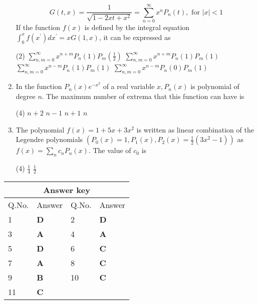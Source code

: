 \begin{enumerate}[label=\color{ocre}\textbf{\arabic*.}]
$$
G(t, x)=\frac{1}{\sqrt{1-2 x t+x^{2}}}=\sum_{n=0}^{\infty} x^{n} P_{n}(t), \text { for }|x|<1
$$
If the function $f(x)$ is defined by the integral equation $\int_{0}^{x} f\left(x^{\prime}\right) d x^{\prime}=x G(1, x)$, it can be expressed as
{}
\begin{tasks}(2)
	\task[\textbf{A.}] $\sum_{n, m=0}^{\infty} x^{n+m} P_{n}(1) P_{m}\left(\frac{1}{2}\right)$
	\task[\textbf{B.}] $\sum_{n, m=0}^{\infty} x^{n+m} P_{n}(1) P_{m}(1)$
	\task[\textbf{C.}] $\sum_{n, m=0}^{\infty} x^{n-m} P_{n}(1) P_{m}(1)$
	\task[\textbf{D.}] $\sum_{n, m=0}^{\infty} x^{n-m} P_{n}(0) P_{m}(1)$
\end{tasks}
	\item In the function $P_{n}(x) e^{-x^{2}}$ of a real variable $x, P_{n}(x)$ is polynomial of degree $n$. The maximum number of extrema that this function can have is
	{}
	\begin{tasks}(4)
		\task[\textbf{A.}] $n+2$
		\task[\textbf{B.}]  $n-1$
		\task[\textbf{C.}] $n+1$
		\task[\textbf{D.}] $n$
	\end{tasks}
	\item The polynomial $f(x)=1+5 x+3 x^{2}$ is written as linear combination of the Legendre polynomials
	$\left(P_{0}(x)=1, P_{1}(x), P_{2}(x)=\frac{1}{2}\left(3 x^{2}-1\right)\right)$ as $f(x)=\sum_{n} c_{n} P_{n}(x)$. The value of $c_{0}$ is
	{}
	\begin{tasks}(4)
		\task[\textbf{A.}] $\frac{1}{4}$
		\task[\textbf{B.}] $\frac{1}{2}$
	\end{tasks}
\end{enumerate}
\setlength\arrayrulewidth{1pt}
\begin{table}[H]
	\centering
	\begin{tabular}{|p{1.5cm}|p{1.5cm}||p{1.5cm}|p{1.5cm}|}
		\hline
		\multicolumn{4}{|c|}{\textbf{Answer key}}\\\hline\hline
		\rowcolor{ocrel}Q.No.&Answer&Q.No.&Answer\\\hline
	1&\textbf{D} &2&\textbf{D}\\\hline 
	3&\textbf{A} &4&\textbf{A} \\\hline
	5&\textbf{D} &6&\textbf{C} \\\hline
	7&\textbf{A}&8&\textbf{C}\\\hline
	9&\textbf{B}&10&\textbf{C}\\\hline
	11&\textbf{C} &&\\\hline
		
	\end{tabular}
\end{table}\newpage 
